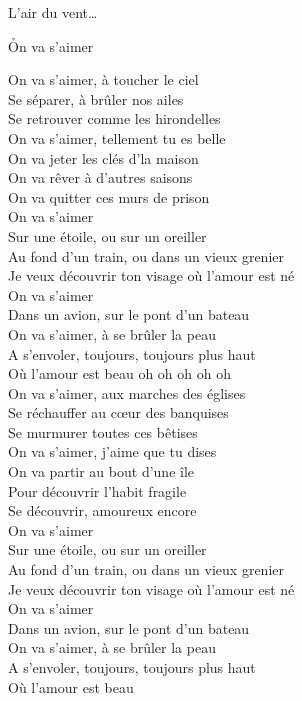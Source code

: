 \documentclass{novel}
\begin{document}
L'air du vent…

\newpage
\normalsize
\h*{On va s’aimer}
\begin{multicols}{2}
On va s'aimer, à  toucher le ciel \\
Se séparer, à  brûler nos ailes \\
Se retrouver comme les hirondelles \\
On va s'aimer, tellement tu es belle \\
On va jeter les clés d'la maison \\
On va rêver à  d'autres saisons \\
On va quitter ces murs de prison \\

On va s'aimer \\
Sur une étoile, ou sur un oreiller \\
Au fond d'un train, ou dans un vieux grenier \\
Je veux découvrir ton visage où l'amour est né \\

On va s'aimer \\
Dans un avion, sur le pont d'un bateau \\
On va s'aimer, à  se brûler la peau \\
A s'envoler, toujours, toujours plus haut \\
Où l'amour est beau oh oh oh oh oh \\

On va s'aimer, aux marches des églises \\
Se réchauffer au cœur des banquises \\
Se murmurer toutes ces bêtises \\
On va s'aimer, j'aime que tu dises \\
On va partir au bout d'une île \\
Pour découvrir l'habit fragile \\
Se découvrir, amoureux encore \\

On va s'aimer \\
Sur une étoile, ou sur un oreiller \\
Au fond d'un train, ou dans un vieux grenier \\
Je veux découvrir ton visage où l'amour est né \\

On va s'aimer \\
Dans un avion, sur le pont d'un bateau \\
On va s'aimer, à  se brûler la peau \\
A s'envoler, toujours, toujours plus haut \\
Où l'amour est beau \\


\end{multicols}
\end{document}
